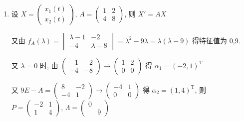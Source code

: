      \paragraph{} %
         \begin{enumerate}
             \item %
                   设 \( X = \begin{pmatrix}
                       x_{1}(t) \\
                       x_{2}(t)
                   \end{pmatrix} \), \( A = \begin{pmatrix}
                       1 & 2 \\
                       4 & 8
                   \end{pmatrix} \), 则 \( X' = AX \)

                   又由 \( f_{A}(\lambda) = \begin{vmatrix}
                       \lambda-1 & -2        \\
                       -4        & \lambda-8
                   \end{vmatrix} = \lambda^{2}-9\lambda = \lambda(\lambda-9) \) 得特征值为 0,9.

                   又 \( \lambda=0 \) 时, 由 \( \begin{pmatrix}
                       -1 & -2 \\
                       -4 & -8
                   \end{pmatrix} \rightarrow \begin{pmatrix}
                       1 & 2 \\
                       0 & 0
                   \end{pmatrix} \) 得 \( \alpha_{1} = (-2, 1)^{\mathrm{T}} \)

                   又 \( 9E-A = \begin{pmatrix}
                       8  & -2 \\
                       -4 & 1
                   \end{pmatrix} \rightarrow \begin{pmatrix}
                       -4 & 1 \\
                       0  & 0
                   \end{pmatrix} \) 得 \( \alpha_{2} = (1, 4)^{\mathrm{T}} \), 则 \( P = \begin{pmatrix}
                       -2 & 1 \\
                       1  & 4
                   \end{pmatrix} \), \( \Lambda = \begin{pmatrix}
                       0 &   \\
                         & 9
                   \end{pmatrix} \)


\end{enumerate}
